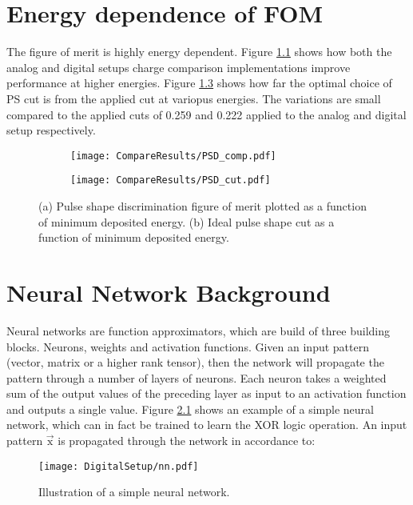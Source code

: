 \documentclass[main.tex]{subfiles}
\begin{document}
\begin{appendices}
\chapter{Energy dependence of FOM}\label{ch:appA}
The figure of merit is highly energy dependent. Figure \ref{fig:psd_fom_trend} shows how both the analog and digital setups charge comparison implementations improve performance at higher energies. Figure  \ref{fig:psd_cut_trend} shows how far the optimal choice of PS cut is from the applied cut at variopus energies. The variations are small compared to the applied cuts of 0.259 and 0.222 applied to the analog and digital setup respectively.
\begin{figure}[ht]
	\begin{subfigure}[b]{\textwidth}
	    \centering
    	\texttt{[image: CompareResults/PSD\_comp.pdf]}
        \caption{}
	    \label{fig:psd_fom_trend} 
	\end{subfigure}
	\begin{subfigure}[b]{\textwidth}
    	\centering
        \texttt{[image: CompareResults/PSD\_cut.pdf]}
        \caption{}
    	\label{fig:psd_cut_trend} 
    \end{subfigure}
    \caption[Energy dependence of PSD figure of merit.]{(a) Pulse shape discrimination figure of merit plotted as a function of minimum deposited energy. (b) Ideal pulse shape cut as a function of minimum deposited energy.}
\end{figure}

\chapter{Neural Network Background}\label{ch:appB}

Neural networks are function approximators, which are build of three building blocks. Neurons, weights and activation functions. Given an input pattern (vector, matrix or a higher rank tensor), then the network will propagate the pattern through a number of layers of neurons. Each neuron takes a weighted sum of the output values of the preceding layer as input to an activation function and outputs a single value. Figure \ref{fig:nn} shows an example of a simple neural network, which can in fact be trained to learn the XOR logic operation. An input pattern $\vec{\textrm{x}}$ is propagated through the network in accordance to:

\begin{figure}[ht!]
    \centering
        \texttt{[image: DigitalSetup/nn.pdf]}
        \caption[Illustration of a simple neural network]{Illustration of a simple neural network.}
    \label{fig:nn} 
\end{figure}



\end{appendices}
\end{document}
